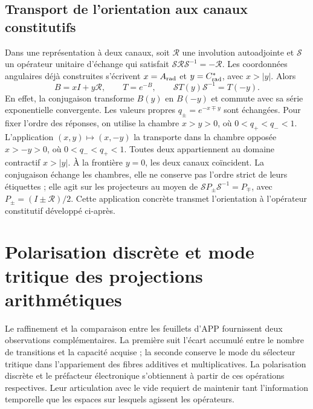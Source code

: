\section{Transport de l’orientation aux canaux constitutifs}

Dans une représentation à deux canaux, soit $\mathcal R$ une involution
autoadjointe et $\mathcal S$ un opérateur unitaire d’échange qui satisfait
$\mathcal S\mathcal R\mathcal S^{-1}=-\mathcal R$. Les coordonnées angulaires
déjà construites s’écrivent $x=A_{\rm rad}$ et $y=C^*_{\rm rad}$, avec $x>|y|$.
Alors
\begin{equation}
 B=xI+y\mathcal R,\qquad T=e^{-B},\qquad
 \mathcal ST(y)\mathcal S^{-1}=T(-y).
 \label{x_reciprocidad:iii:eq:channel-conjugation}
\end{equation}
En effet, la conjugaison transforme $B(y)$ en $B(-y)$ et commute avec sa série
exponentielle convergente. Les valeurs propres $q_\pm=e^{-x\mp y}$ sont échangées.
Pour fixer l’ordre des réponses, on utilise la chambre $x>y>0$, où
$0<q_+<q_-<1$. L’application $(x,y)\mapsto(x,-y)$ la transporte dans la
chambre opposée $x>-y>0$, où $0<q_-<q_+<1$. Toutes deux appartiennent au domaine
contractif $x>|y|$. À la frontière $y=0$, les deux canaux coïncident.
La conjugaison échange les chambres, elle ne conserve pas l’ordre strict de
leurs étiquettes ; elle agit sur les projecteurs au moyen de
$\mathcal SP_\pm\mathcal S^{-1}=P_\mp$, avec
$P_\pm=(I\pm\mathcal R)/2$.
Cette application concrète transmet l’orientation à l’opérateur constitutif
développé ci-après.



\chapter{Polarisation discrète et mode tritique des projections arithmétiques}
\label{x_reciprocidad:iii:sec:vacancias-prefactor}

Le raffinement et la comparaison entre les feuillets d’APP fournissent deux
observations complémentaires. La première suit l’écart accumulé
entre le nombre de transitions et la capacité acquise ; la seconde conserve
le mode du sélecteur tritique dans l’appariement des fibres additives et
multiplicatives. La polarisation discrète et le préfacteur électronique
s’obtiennent à partir de ces opérations respectives. Leur articulation avec le vide
requiert de maintenir tant l’information temporelle que les espaces sur
lesquels agissent les opérateurs.

